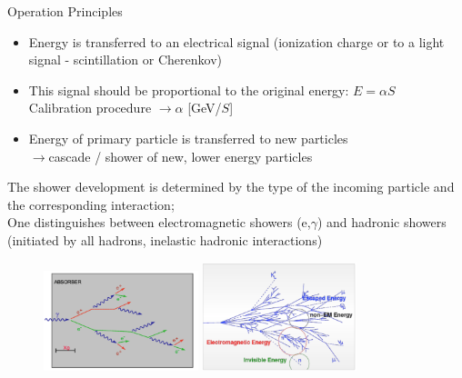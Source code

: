 \documentclass[style=husky,clock,size=9pt,dvipsnames]{powerdot}
\newcommand\ra{$\rightarrow$} %
\begin{document}
\begin{slide}[trans=Fly]{Operation Principles}
	\begin{itemize}
		\item
		Energy is transferred to an electrical signal (ionization charge or to a light signal - scintillation or Cherenkov)
		\item 
		This signal should be proportional to the original energy: $E =\alpha S$\\
		Calibration procedure \ra $\alpha$ [GeV/$S$]
		\item
		Energy of primary particle is transferred to new particles\\
		\ra cascade / shower of new, lower energy particles
	\end{itemize}
		The shower development is determined by the type of the incoming particle and the corresponding interaction;\\
		One distinguishes between electromagnetic showers (e,$\gamma$) and hadronic showers (initiated by all hadrons, inelastic hadronic interactions)
		\begin{figure}
			\includegraphics[width=0.4\textwidth]{Figures/em_calorimeter}
			\includegraphics[width=0.4\textwidth]{Figures/hadr_calorimeter}
		\end{figure}
\end{slide}
\end{document}
